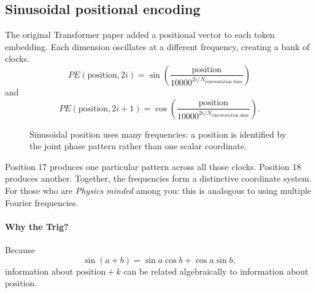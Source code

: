 \subsection{Sinusoidal positional encoding}
\label{subsec:modern-sinusoidal-position}
The original Transformer paper added a positional vector to each token embedding.
Each dimension oscillates at a different frequency, creating a bank of clocks.
\[
    PE(\text{position},2i)
    =
    \sin\!\left(
    \frac{\text{position}}{10000^{2i/N_{\text{representation dims}}}}
    \right)
\]
and
\[
    PE(\text{position},2i+1)
    =
    \cos\!\left(
    \frac{\text{position}}{10000^{2i/N_{\text{representation dims}}}}
    \right).
\]

\begin{figure}[htbp]
    \centering
    \caption{Sinusoidal position uses many frequencies: a position is identified by the joint phase pattern rather than one scalar coordinate.}
    \label{fig:modern-sinusoidal-clocks}
\end{figure}
Position 17 produces one particular pattern across all those clocks.
Position 18 produces another.
Together, the frequencies form a distinctive coordinate system.
For those who are \textit{Physics minded} among you: this is analogous to using multiple Fourier frequencies.

\paragraph{Why the Trig?}
Because
\[
    \sin(a+b)=\sin a\cos b+\cos a\sin b,
\]
information about $\text{position}+k$ can be related algebraically to information about $\text{position}$.



